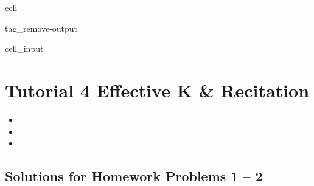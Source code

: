 \documentclass[letterpaper,10pt,english]{jupyterBook}
\begin{document}
\begin{sphinxuseclass}{cell}
\begin{sphinxuseclass}{tag_remove-output}\begin{sphinxVerbatimInput}

\begin{sphinxuseclass}{cell_input}
\begin{sphinxVerbatim}[commandchars=\\\{\}]
   
   
    
   
\end{sphinxVerbatim}

\end{sphinxuseclass}\end{sphinxVerbatimInput}

\end{sphinxuseclass}
\end{sphinxuseclass}

\chapter{Tutorial 4 \sphinxhyphen{} Effective K \& Recitation}
\label{\detokenize{content/tutorials/T4/tutorial_04:tutorial-4-effective-k-recitation}}\label{\detokenize{content/tutorials/T4/tutorial_04::doc}}\begin{itemize}
\item {} 
\sphinxAtStartPar
{}

\item {} 
\sphinxAtStartPar
{}

\item {} 
\sphinxAtStartPar
{}

\end{itemize}


\section{Solutions for Homework Problems 1 – 2}
\label{\detokenize{content/tutorials/T4/tutorial_04:solutions-for-homework-problems-1-2}}
\end{document}
